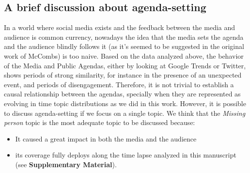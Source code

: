 \documentclass{bmcart}
\begin{document}
\subsection*{A brief discussion about agenda-setting}
\label{sec:who_sets}

\par In a world where social media exists and the feedback between the media and audience is common currency, nowadays the idea that the media sets the agenda and the audience blindly follows it (as it's seemed to be suggested in the original work of McCombs) is too naive. Based on the data analyzed above, the behavior of the Media and Public Agendas, either by looking at Google Trends or Twitter, shows periods of strong similarity, for instance in the presence of an unexpected event, and periods of disengagement. 
Therefore, it is not trivial to establish a causal relationship between the agendas, specially when they are represented as evolving in time topic distributions as we did in this work. 
However, it is possible to discuss agenda-setting if we focus on a single topic.
 We think that the \emph{Missing person} topic is the most adequate topic to be discussed because:
\begin{itemize} 
\item It caused a great impact in both the media and the audience
\item  its coverage fully deploys along the time lapse analyzed in this manuscript (see \textbf{Supplementary Material}).
\end{itemize}
\end{document}
